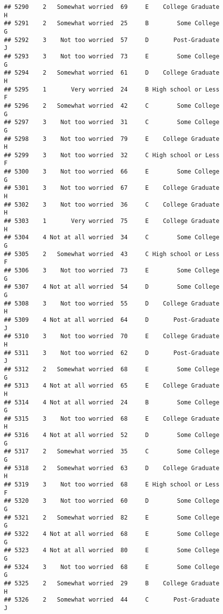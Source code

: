 \documentclass[
]{article}
\begin{document}
\begin{verbatim}
## 5290    2   Somewhat worried  69     E    College Graduate         H
## 5291    2   Somewhat worried  25     B        Some College         G
## 5292    3    Not too worried  57     D       Post-Graduate         J
## 5293    3    Not too worried  73     E        Some College         G
## 5294    2   Somewhat worried  61     D    College Graduate         H
## 5295    1       Very worried  24     B High school or Less         F
## 5296    2   Somewhat worried  42     C        Some College         G
## 5297    3    Not too worried  31     C        Some College         G
## 5298    3    Not too worried  79     E    College Graduate         H
## 5299    3    Not too worried  32     C High school or Less         F
## 5300    3    Not too worried  66     E        Some College         G
## 5301    3    Not too worried  67     E    College Graduate         H
## 5302    3    Not too worried  36     C    College Graduate         H
## 5303    1       Very worried  75     E    College Graduate         H
## 5304    4 Not at all worried  34     C        Some College         G
## 5305    2   Somewhat worried  43     C High school or Less         F
## 5306    3    Not too worried  73     E        Some College         G
## 5307    4 Not at all worried  54     D        Some College         G
## 5308    3    Not too worried  55     D    College Graduate         H
## 5309    4 Not at all worried  64     D       Post-Graduate         J
## 5310    3    Not too worried  70     E    College Graduate         H
## 5311    3    Not too worried  62     D       Post-Graduate         J
## 5312    2   Somewhat worried  68     E        Some College         G
## 5313    4 Not at all worried  65     E    College Graduate         H
## 5314    4 Not at all worried  24     B        Some College         G
## 5315    3    Not too worried  68     E    College Graduate         H
## 5316    4 Not at all worried  52     D        Some College         G
## 5317    2   Somewhat worried  35     C        Some College         G
## 5318    2   Somewhat worried  63     D    College Graduate         H
## 5319    3    Not too worried  68     E High school or Less         F
## 5320    3    Not too worried  60     D        Some College         G
## 5321    2   Somewhat worried  82     E        Some College         G
## 5322    4 Not at all worried  68     E        Some College         G
## 5323    4 Not at all worried  80     E        Some College         G
## 5324    3    Not too worried  68     E        Some College         G
## 5325    2   Somewhat worried  29     B    College Graduate         H
## 5326    2   Somewhat worried  44     C       Post-Graduate         J

\end{verbatim}
\end{document}
